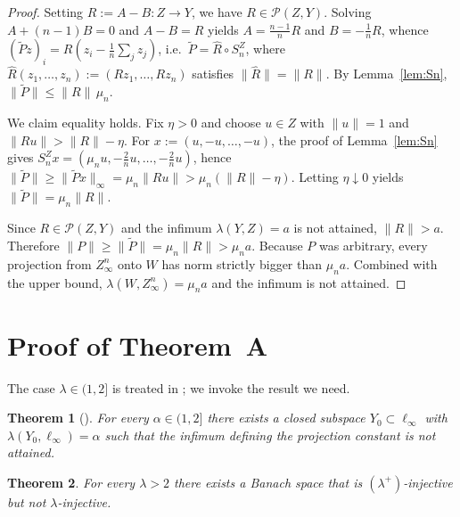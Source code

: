 \documentclass[11pt]{amsart}
\renewcommand{\le}{\leqslant}
\renewcommand{\ge}{\geqslant}
\newtheorem{theorem}{Theorem}[section]
\theoremstyle{definition}
\theoremstyle{remark}
\theoremstyle{plain}
\numberwithin{equation}{section}
\begin{document}
\begin{proof}
Setting $R:=A-B\colon Z\to Y$, we have $R\in\mathcal P(Z,Y)$.  Solving
$A+(n-1)B=0$ and $A-B=R$ yields $A=\frac{n-1}{n}R$ and
$B=-\frac{1}{n}R$, whence
$(\widetilde Pz)_i = R(z_i-\frac{1}{n}\sum_j z_j)$,
i.e.\ $\widetilde P=\widehat R\circ S_n^Z$, where
$\widehat R(z_1,\dots,z_n):=(Rz_1,\dots,Rz_n)$ satisfies
$\|\widehat R\|=\|R\|$.  By Lemma~\ref{lem:Sn},
$\|\widetilde P\|\le\|R\|\,\mu_n$.

We claim equality holds.  Fix $\eta>0$ and choose $u\in Z$ with
$\|u\|=1$ and $\|Ru\|>\|R\|-\eta$.  For $x:=(u,-u,\dots,-u)$, the
proof of Lemma~\ref{lem:Sn} gives
$S_n^Zx=(\mu_n u,-\tfrac{2}{n}u,\dots,-\tfrac{2}{n}u)$, hence
$\|\widetilde P\|\ge\|\widetilde Px\|_\infty=\mu_n\|Ru\|
>\mu_n(\|R\|-\eta)$.
Letting $\eta\downarrow 0$ yields $\|\widetilde P\|=\mu_n\|R\|$.

Since $R\in\mathcal P(Z,Y)$ and the infimum $\lambda(Y,Z)=a$ is not
attained, $\|R\|>a$.  Therefore
$\|P\|\ge\|\widetilde P\|=\mu_n\|R\|>\mu_n a$.
Because $P$ was arbitrary, every projection from $Z_\infty^n$ onto $W$
has norm strictly bigger than $\mu_n a$.  Combined with the upper bound,
$\lambda(W,Z_\infty^n)=\mu_n a$ and the infimum is not attained.
\end{proof}

\section{Proof of Theorem~A}\label{sec:main_proof}

The case $\lambda\in(1,2]$ is treated in \cite{KaniaLewicki}; we invoke
the result we need.

\begin{theorem}[{\cite[Theorem~A]{KaniaLewicki}}]%
\label{thm:KL}
For every $\alpha\in(1,2]$ there exists a closed subspace
$Y_0\subset\ell_\infty$ with $\lambda(Y_0,\ell_\infty)=\alpha$ such that the
infimum defining the projection constant is not attained.
\end{theorem}

\begin{theorem}\label{thm:main_real}
For every $\lambda>2$ there exists a Banach space that is
$(\lambda^+)$-injective but not $\lambda$-injective.
\end{theorem}
\end{document}
